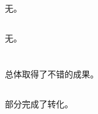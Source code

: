 \documentclass{nsfc-con-report}
\begin{document}
\subsection{\cldpcoop}


\subsection{\cldpintcoop}
无。
\subsection{\cldpproblem}
无。
\section{\projectACHP}
\subsection{\achpachievement}
总体取得了不错的成果。
\subsection{\achpapplication}
部分完成了转化。

\end{document}
